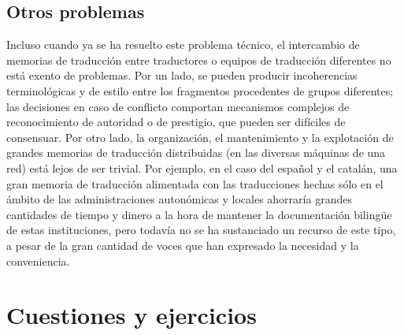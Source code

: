 \subsection{Otros problemas} Incluso cuando ya se ha resuelto este problema técnico, el intercambio de memorias de traducción entre traductores o equipos de traducción diferentes no está exento de problemas. Por un lado, se pueden producir incoherencias terminológicas y de estilo entre los fragmentos procedentes de grupos diferentes; las decisiones en caso de conflicto comportan mecanismos complejos de reconocimiento de autoridad o de prestigio, que pueden ser difíciles de consensuar. Por otro lado, la organización, el mantenimiento y la explotación de grandes memorias de traducción distribuidas (en las diversas máquinas de una red) está lejos de ser trivial. Por ejemplo, en el caso del español y el catalán, una gran memoria de traducción alimentada con las traducciones hechas sólo en el ámbito de las administraciones autonómicas y locales ahorraría grandes cantidades de tiempo y dinero a la hora de mantener la documentación bilingüe de estas instituciones, pero todavía no se ha sustanciado un recurso de este tipo, a pesar de la gran cantidad de voces que han expresado la necesidad y la conveniencia. 

\section{Cuestiones y ejercicios} 

